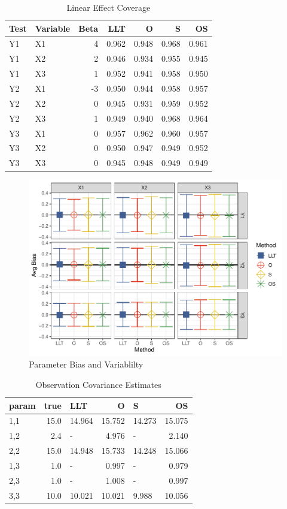 \documentclass[
]{article}
\begin{document}
\begin{longtable}[t]{l|l|r|r|r|r|r}
\caption{\label{tab:unnamed-chunk-20}Linear Effect Coverage}\\
\hline
Test & Variable & Beta & LLT & O & S & OS\\
\hline
Y1 & X1 & 4 & 0.962 & 0.948 & 0.968 & 0.961\\
\hline
Y1 & X2 & 2 & 0.946 & 0.934 & 0.955 & 0.945\\
\hline
Y1 & X3 & 1 & 0.952 & 0.941 & 0.958 & 0.950\\
\hline
Y2 & X1 & -3 & 0.950 & 0.944 & 0.958 & 0.957\\
\hline
Y2 & X2 & 0 & 0.945 & 0.931 & 0.959 & 0.952\\
\hline
Y2 & X3 & 1 & 0.949 & 0.940 & 0.968 & 0.964\\
\hline
Y3 & X1 & 0 & 0.957 & 0.962 & 0.960 & 0.957\\
\hline
Y3 & X2 & 0 & 0.950 & 0.947 & 0.949 & 0.952\\
\hline
Y3 & X3 & 0 & 0.945 & 0.948 & 0.949 & 0.949\\
\hline
\end{longtable}

\begin{figure}
\centering
\includegraphics{FullSimulation_files/figure-latex/unnamed-chunk-21-1.pdf}
\caption{\label{fig:unnamed-chunk-21}Parameter Bias and Variablilty}
\end{figure}

\begin{longtable}[t]{l|r|l|r|l|r}
\caption{\label{tab:unnamed-chunk-22}Observation Covariance Estimates}\\
\hline
param & true & LLT & O & S & OS\\
\hline
1,1 & 15.0 & 14.964 & 15.752 & 14.273 & 15.075\\
\hline
1,2 & 2.4 & - & 4.976 & - & 2.140\\
\hline
2,2 & 15.0 & 14.948 & 15.733 & 14.248 & 15.066\\
\hline
1,3 & 1.0 & - & 0.997 & - & 0.979\\
\hline
2,3 & 1.0 & - & 1.008 & - & 0.997\\
\hline
3,3 & 10.0 & 10.021 & 10.021 & 9.988 & 10.056\\
\hline
\end{longtable}
\end{document}
